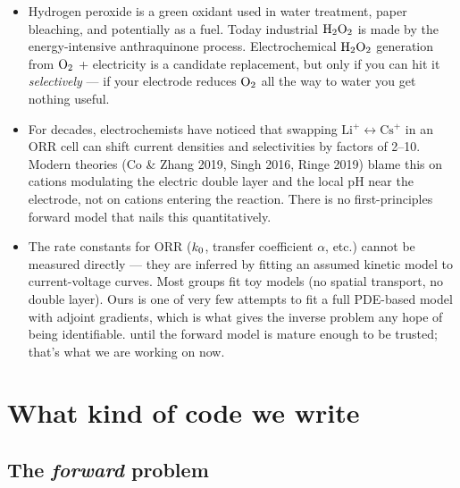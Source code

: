 \documentclass[11pt]{article}
\begin{document}
\begin{itemize}[leftmargin=*]
\item {} Hydrogen peroxide is
  a green oxidant used in water treatment, paper bleaching, and
  potentially as a fuel. Today industrial $\mathrm{H_2O_2}$ is made by the
  energy-intensive anthraquinone process. Electrochemical $\mathrm{H_2O_2}$
  generation from $\mathrm{O_2}$ + electricity is a candidate replacement,
  but only if you can hit it \textit{selectively} --- if your
  electrode reduces $\mathrm{O_2}$ all the way to water you get nothing
  useful.
\item {} For
  decades, electrochemists have noticed that swapping
  $\mathrm{Li^+} \leftrightarrow \mathrm{Cs^+}$ in an ORR cell can
  shift current densities and selectivities by factors of 2--10.
  Modern theories (Co \& Zhang 2019, Singh 2016, Ringe 2019) blame
  this on cations modulating the electric double layer and the local
  pH near the electrode, not on cations entering the reaction. There
  is no first-principles forward model that nails this quantitatively.
\item {} The
  rate constants for ORR ($k_0$, transfer coefficient $\alpha$, etc.)
  cannot be measured directly --- they are inferred by fitting an
  assumed kinetic model to current-voltage curves. Most groups fit
  toy models (no spatial transport, no double layer). Ours is one of
  very few attempts to fit a full PDE-based model with adjoint
  gradients, which is what gives the inverse problem any hope of being
  identifiable.  until the
  forward model is mature enough to be trusted; that's what we are
  working on now.
\end{itemize}

\section{What kind of code we write}

\subsection{The \emph{forward} problem}
\end{document}
